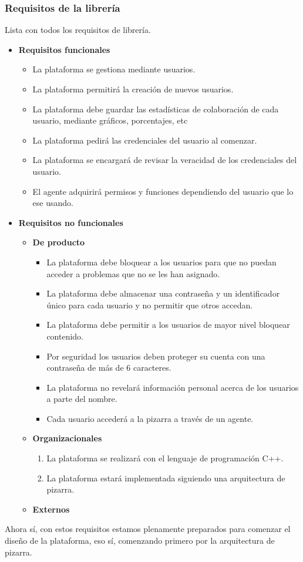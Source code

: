 \subsubsection{Requisitos de la librería}\label{reqdiseñolib}
Lista con todos los requisitos de librería.
\begin{itemize}
\item \textbf{Requisitos funcionales}
		\begin{itemize}
			\item La plataforma se gestiona mediante usuarios.
					\item La plataforma permitirá la creación de nuevos usuarios.
					\item La plataforma debe guardar las estadísticas de colaboración de cada usuario, mediante gráficos, porcentajes, etc
					\item La plataforma pedirá las credenciales del usuario al comenzar.
					\item La plataforma se encargará de revisar la veracidad de los credenciales del usuario.
					\item El agente adquirirá permisos y funciones dependiendo del usuario que lo ese usando.
		\end{itemize}
\item \textbf{Requisitos no funcionales}
		\begin{itemize}
			\item \textbf{De producto}
					\begin{itemize}
					\item La plataforma debe bloquear a los usuarios para que no puedan acceder a problemas que no se les han asignado.
					\item La plataforma debe almacenar una contraseña y un identificador único para cada usuario y no permitir que otros accedan.
					\item La plataforma debe permitir a los usuarios de mayor nivel bloquear contenido.
					\item Por seguridad los usuarios deben proteger su cuenta con una contraseña de más de 6 caracteres.
					\item La plataforma no revelará información personal acerca de los usuarios a parte del nombre.
					\item Cada usuario accederá a la pizarra a través de un agente.
					\end{itemize}
			\item \textbf{Organizacionales}
					\begin{enumerate}
						\item La plataforma se realizará con el lenguaje de programación C++.
						\item La plataforma estará implementada siguiendo una arquitectura de pizarra.
					\end{enumerate}
			\item \textbf{Externos}
		\end{itemize}
\end{itemize}



Ahora sí, con estos requisitos estamos plenamente preparados para comenzar el diseño de la plataforma, eso sí, comenzando primero por la arquitectura de pizarra.